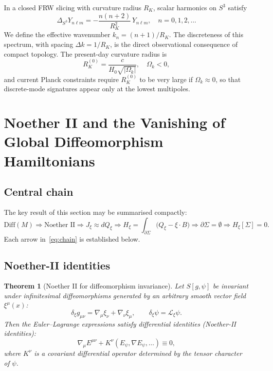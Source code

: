 \documentclass[12pt,a4paper]{article}
\newtheorem{theorem}{Theorem}[section]
\newcommand{\Sig}{\Sigma}           %
\newcommand{\pa}{\partial}          %
\newcommand{\Diff}{\mathrm{Diff}}
\newcommand{\Jxi}{J_\xi}
\newcommand{\Qxi}{Q_\xi}
\newcommand{\Hxi}{H_\xi}
\newcommand{\RK}{R_K}
\newcommand{\onshell}{\approx}
\begin{document}
In a closed FRW slicing with curvature radius $\RK$,
scalar harmonics on $S^3$ satisfy
\begin{equation}
  \Delta_{S^3} Y_{n\ell m} = -\frac{n(n+2)}{\RK^2}\,Y_{n\ell m},
  \quad n = 0, 1, 2, \ldots
  \label{eq:laplacian}
\end{equation}
We define the effective wavenumber $k_n = (n+1)/\RK$.
The discreteness of this spectrum, with spacing
$\Delta k = 1/\RK$, is the direct observational
consequence of compact topology. The present-day curvature
radius is
\begin{equation}
  \RK^{(0)} = \frac{c}{H_0\sqrt{|\Omega_k|}},
  \quad \Omega_k < 0,
  \label{eq:RK}
\end{equation}
and current Planck constraints require $\RK^{(0)}$ to be
very large if $\Omega_k \approx 0$, so that discrete-mode
signatures appear only at the lowest multipoles.

\section{Noether II and the Vanishing of Global
         Diffeomorphism Hamiltonians}
\label{sec:noether}

\subsection{Central chain}

The key result of this section may be summarised compactly:
\begin{equation}
  \boxed{
    \Diff(M) \Rightarrow \text{Noether II}
    \Rightarrow \Jxi \onshell d\Qxi
    \Rightarrow \Hxi = \int_{\pa\Sig}\!\!\bigl(\Qxi - \xi\cdot B\bigr)
    \Rightarrow \pa\Sig = \emptyset
    \Rightarrow \Hxi[\Sig] = 0.
  }
  \label{eq:chain}
\end{equation}
Each arrow in~\eqref{eq:chain} is established below.

\subsection{Noether-II identities}

\begin{theorem}[Noether II for diffeomorphism invariance]
\label{thm:noether2}
Let $S[g, \psi]$ be invariant under infinitesimal
diffeomorphisms generated by an arbitrary smooth vector
field $\xi^\mu(x)$:
\begin{equation}
  \delta_\xi g_{\mu\nu} = \nabla_\mu\xi_\nu + \nabla_\nu\xi_\mu,
  \qquad
  \delta_\xi\psi = \mathcal{L}_\xi\psi.
  \label{eq:diffvar}
\end{equation}
Then the Euler--Lagrange expressions satisfy differential
identities (Noether-II identities):
\begin{equation}
  \nabla_\mu E^{\mu\nu} + K^\nu(E_\psi, \nabla E_\psi, \ldots)
  \equiv 0,
  \label{eq:noether2id}
\end{equation}
where $K^\nu$ is a covariant differential operator determined
by the tensor character of $\psi$.
\end{theorem}
\end{document}
